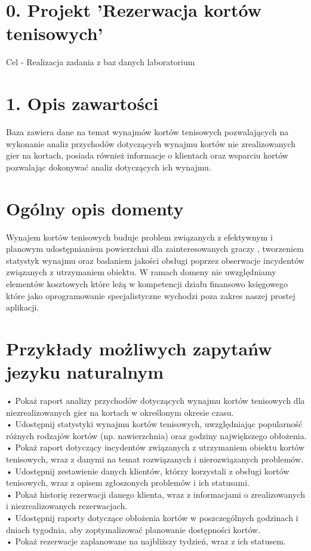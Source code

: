 \documentclass{article}
\begin{document}
\section*{0. Projekt 'Rezerwacja kortów tenisowych'}
Cel - Realizacja zadania z baz danych  laboratorium 

\section*{1. Opis zawartości}

Baza zawiera dane na temat wynajmów kortów tenisowych pozwalających na wykonanie analiz przychodów dotyczących wynajmu kortów nie zrealizowanych gier na kortach, posiada również informacje o klientach oraz wsparciu kortów pozwalając dokonywać analiz dotyczących ich wynajmu.


\section*{Ogólny opis domenty}

Wynajem kortów tenisowych buduje problem  związanych z efektywnym i planowym udostępnianiem powierzchni dla zainteresowanych graczy , tworzeniem statystyk wynajmu oraz badaniem jakości obsługi poprzez obserwacje incydentów związanych z utrzymaniem obiektu.
W ramach domeny nie uwzględniamy elementów kosztowych  które leżą w kompetencji działu finansowo księgowego które jako oprogramowanie specjalistyczne  wychodzi poza zakres naszej prostej aplikacji.


\section*{Przykłady możliwych zapytańw jezyku naturalnym}

\noindent

•	Pokaż raport analizy przychodów dotyczących wynajmu kortów tenisowych dla niezrealizowanych gier na kortach w określonym okresie czasu.\\
•	Udostępnij statystyki wynajmu kortów tenisowych, uwzględniając popularność różnych rodzajów kortów (np. nawierzchnia) oraz godziny największego obłożenia.\\
•	Pokaż raport dotyczący incydentów związanych z utrzymaniem obiektu kortów tenisowych, wraz z danymi na temat rozwiązanych i nierozwiązanych problemów.\\
•	Udostępnij zestawienie danych klientów, którzy korzystali z obsługi kortów tenisowych, wraz z opisem zgłoszonych problemów i ich statusami.\\
•	Pokaż historię rezerwacji danego klienta, wraz z informacjami o zrealizowanych i niezrealizowanych rezerwacjach.\\
•	Udostępnij raporty dotyczące obłożenia kortów w poszczególnych godzinach i dniach tygodnia, aby zoptymalizować planowanie dostępności kortów.\\
•	Pokaż rezerwacje zaplanowane na najbliższy tydzień, wraz z ich statusem.
\end{document}

